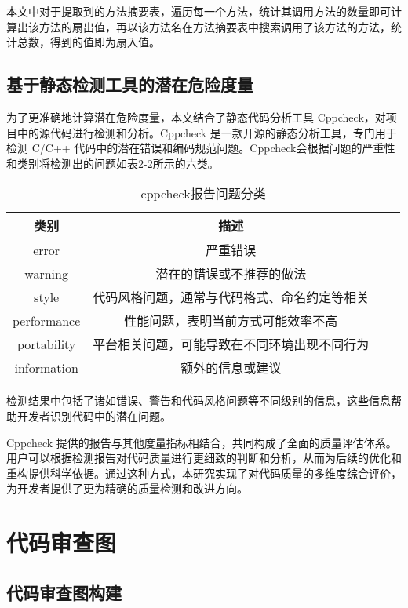 本文中对于提取到的方法摘要表，遍历每一个方法，统计其调用方法的数量即可计算出该方法的扇出值，再以该方法名在方法摘要表中搜索调用了该方法的方法，统计总数，得到的值即为扇入值。

\subsection{基于静态检测工具的潜在危险度量}

为了更准确地计算潜在危险度量，本文结合了静态代码分析工具 Cppcheck，对项目中的源代码进行检测和分析。Cppcheck 是一款开源的静态分析工具，专门用于检测 C/C++ 代码中的潜在错误和编码规范问题。Cppcheck会根据问题的严重性和类别将检测出的问题如表2-2所示的六类。

\begin{table}[htbp]
\caption{cppcheck报告问题分类}
\vspace{0.5em}\centering\wuhao
\begin{tabular}{cccc}
\toprule
类别 & 描述 \\
\midrule
error &  严重错误 \\
warning & 潜在的错误或不推荐的做法 \\
style & 代码风格问题，通常与代码格式、命名约定等相关 \\
performance & 性能问题，表明当前方式可能效率不高 \\ 
portability & 平台相关问题，可能导致在不同环境出现不同行为 \\
information & 额外的信息或建议 \\ 
\bottomrule
\end{tabular}
\end{table}

检测结果中包括了诸如错误、警告和代码风格问题等不同级别的信息，这些信息帮助开发者识别代码中的潜在问题。

Cppcheck 提供的报告与其他度量指标相结合，共同构成了全面的质量评估体系。用户可以根据检测报告对代码质量进行更细致的判断和分析，从而为后续的优化和重构提供科学依据。通过这种方式，本研究实现了对代码质量的多维度综合评价，为开发者提供了更为精确的质量检测和改进方向。



\section{代码审查图}

\subsection{代码审查图构建}


